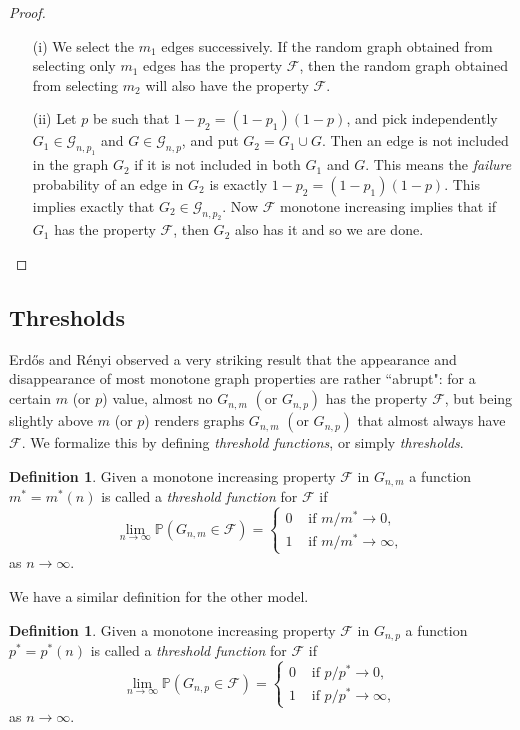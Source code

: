 \documentclass[12pt,oneside,reqno]{amsart}
\theoremstyle{definition}
\newtheorem{definition}[theorem]{Definition}
\numberwithin{equation}{theorem}
\newcommand{\cF}{{\mathcal F}}
\newcommand{\sG}{{\mathscr{G}}}
\begin{document}
\begin{proof}
\begin{itemize}
\item[(i)] We select the $m_1$ edges successively. If the random graph obtained from selecting only $m_1$ edges has the property $\cF$, then the random graph obtained from selecting $m_2$ will also have the property $\cF$.
\item[(ii)] Let $p$ be such that $1-p_2=\left(1-p_1\right)\left(1-p\right)$, and pick independently $G_1 \in \sG_{n,p_1}$ and $G \in \sG_{n,p}$, and put $G_2=G_1 \cup G$. Then an edge is not included in the graph $G_2$ if it is not included in both $G_1$ and $G$. This means the \emph{failure} probability of an edge in $G_2$ is exactly $1-p_2=\left(1-p_1\right)\left(1-p\right)$. This implies exactly that $G_2 \in \sG_{n,p_2}$. Now $\cF$ monotone increasing implies that if $G_1$ has the property $\cF$, then $G_2$ also has it and so we are done. 
\end{itemize}
\end{proof}

\subsection{Thresholds}

Erd\H{o}s and R\'{e}nyi observed a very striking result that the appearance and disappearance of most monotone graph properties are rather ``abrupt": for a certain $m$ (or $p$) value, almost no $G_{n,m}$ $(\textrm{or } G_{n,p})$ has the property $\cF$, but being slightly above $m$ (or $p$) renders graphs $G_{n,m}$ $(\textrm{or } G_{n,p})$ that almost always have $\cF$. We formalize this by defining \emph{threshold functions}, or simply \emph{thresholds}.

\begin{definition}
Given a monotone increasing property $\cF$ in $G_{n,m}$ a function $m^*=m^*(n)$ is called a \emph{threshold function} for $\cF$ if
$$
\lim _{n \rightarrow \infty} \mathbb{P}\left({G}_{n, m} \in \cF \right)= \begin{cases}0 & \text { if } m / m^* \rightarrow 0, \\ 1 & \text { if } m / m^* \rightarrow \infty,\end{cases}
$$
as $n \rightarrow \infty$.
\end{definition}

We have a similar definition for the other model.

\begin{definition}
Given a monotone increasing property $\cF$ in $G_{n,p}$ a function $p^*=p^*(n)$ is called a \emph{threshold function} for $\cF$ if
$$
\lim _{n \rightarrow \infty} \mathbb{P}\left({G}_{n, p} \in \cF \right)= \begin{cases}0 & \text { if } p / p^* \rightarrow 0, \\ 1 & \text { if } p / p^* \rightarrow \infty,\end{cases}
$$
as $n \rightarrow \infty$.
\end{definition}
\end{document}
